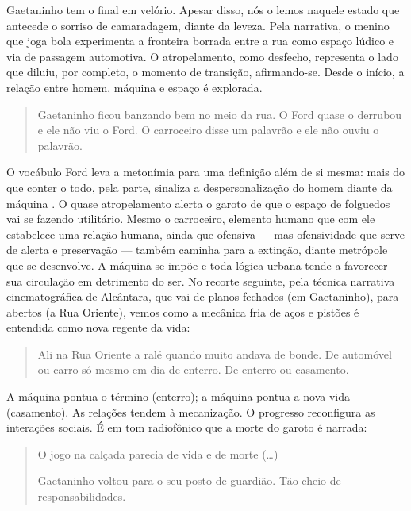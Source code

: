 \begin{refsection}
    Gaetaninho tem o final em velório. Apesar disso, nós o lemos naquele estado que antecede o sorriso de camaradagem, diante da leveza.  Pela narrativa, o menino que joga bola experimenta a fronteira borrada entre a rua como espaço lúdico e via de passagem automotiva. O atropelamento, como desfecho, representa o lado que diluiu, por completo, o momento de transição, afirmando-se. Desde o início, a relação entre homem, máquina e espaço é explorada.  

    \begin{quotation}
        Gaetaninho ficou banzando bem no meio da rua. O Ford quase o derrubou e ele não viu o Ford. O carroceiro disse um palavrão e ele não ouviu o palavrão. \cite[p.~20]{Machado2003Contos}
    \end{quotation}

    O vocábulo Ford leva a metonímia para uma definição além de si mesma: mais do que conter o todo, pela parte, sinaliza a despersonalização do homem diante da máquina \cite{Silva2010Bras}. O quase atropelamento alerta o garoto de que o espaço de folguedos vai se fazendo utilitário. Mesmo o carroceiro, elemento humano que com ele estabelece uma relação humana, ainda que ofensiva --- mas ofensividade que serve de alerta e preservação --- também caminha para a extinção, diante metrópole que se desenvolve. A máquina se impõe e toda lógica urbana tende a favorecer sua circulação em detrimento do ser. No recorte seguinte, pela técnica narrativa cinematográfica de Alcântara, que vai de planos fechados (em Gaetaninho), para abertos (a Rua Oriente), vemos como a mecânica fria de aços e pistões é entendida como nova regente da vida: 

    \begin{quotation}
        Ali na Rua Oriente a ralé quando muito andava de bonde. De automóvel ou carro só mesmo em dia de enterro. De enterro ou casamento. \cite[p.~20]{Machado2003Contos}
    \end{quotation}

    A máquina pontua o término (enterro); a máquina pontua a nova vida (casamento). As relações tendem à mecanização. O progresso reconfigura as interações sociais. É em tom radiofônico que a morte do garoto é narrada:

    \begin{quotation}
        O jogo na calçada parecia de vida e de morte (\dots)  

        Gaetaninho voltou para o seu posto de guardião. Tão cheio de responsabilidades. 
    

\end{quotation}
\end{refsection}
